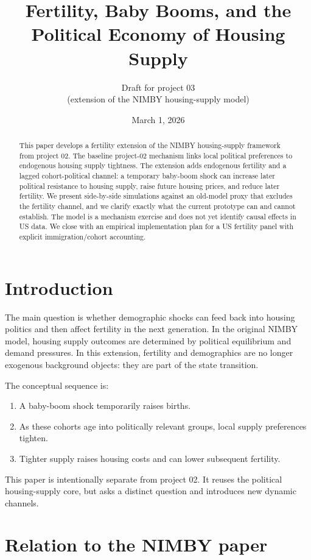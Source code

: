 \documentclass[11pt]{article}
\title{Fertility, Baby Booms, and the Political Economy of Housing Supply}
\author{Draft for project 03\\(extension of the NIMBY housing-supply model)}
\date{March 1, 2026}
\begin{document}
\maketitle

\begin{abstract}
This paper develops a fertility extension of the NIMBY housing-supply framework from project 02.
The baseline project-02 mechanism links local political preferences to endogenous housing supply
tightness. The extension adds endogenous fertility and a lagged cohort-political channel:
a temporary baby-boom shock can increase later political resistance to housing supply, raise
future housing prices, and reduce later fertility. We present side-by-side simulations against
an old-model proxy that excludes the fertility channel, and we clarify exactly what the current
prototype can and cannot establish. The model is a mechanism exercise and does not yet identify
causal effects in US data. We close with an empirical implementation plan for a US fertility
panel with explicit immigration/cohort accounting.
\end{abstract}

\section{Introduction}

The main question is whether demographic shocks can feed back into housing politics and then
affect fertility in the next generation. In the original NIMBY model, housing supply outcomes are
determined by political equilibrium and demand pressures. In this extension, fertility and
demographics are no longer exogenous background objects: they are part of the state transition.

The conceptual sequence is:
\begin{enumerate}
\item A baby-boom shock temporarily raises births.
\item As these cohorts age into politically relevant groups, local supply preferences tighten.
\item Tighter supply raises housing costs and can lower subsequent fertility.
\end{enumerate}

This paper is intentionally separate from project 02. It reuses the political housing-supply core,
but asks a distinct question and introduces new dynamic channels.

\section{Relation to the NIMBY paper}
\end{document}

